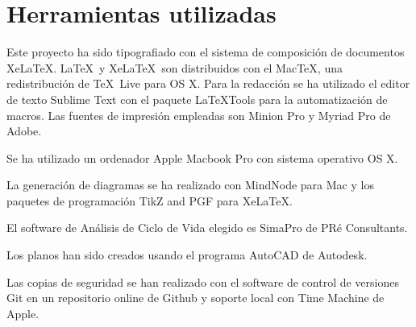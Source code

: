 \chapter{Herramientas utilizadas}\label{apend:herramientas}

Este proyecto ha sido tipografiado con el sistema de composición de documentos Xe\LaTeX. \LaTeX\ y Xe\LaTeX\ son distribuidos con el Mac\TeX, una redistribución de \TeX\ Live para OS X. Para la redacción se ha utilizado el editor de texto Sublime Text con el paquete LaTeXTools para la automatización de macros. Las fuentes de impresión empleadas son Minion Pro y Myriad Pro de Adobe.

Se ha utilizado un ordenador Apple Macbook Pro con sistema operativo OS X.

La generación de diagramas se ha realizado con MindNode para Mac y los paquetes de programación TikZ and PGF para Xe\LaTeX.

El software de Análisis de Ciclo de Vida elegido es SimaPro de PRé Consultants.

Los planos han sido creados usando el programa AutoCAD de Autodesk.

Las copias de seguridad se han realizado con el software de control de versiones Git en un repositorio online de Github y soporte local con Time Machine de Apple.
